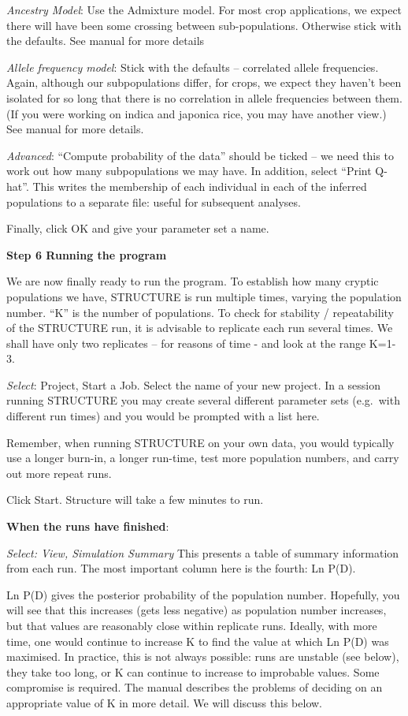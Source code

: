 \documentclass[
]{book}
\begin{document}
\emph{Ancestry Model}: Use the Admixture model. For most crop applications, we expect there will have been some crossing between sub-populations. Otherwise stick with the defaults. See manual for more details

\emph{Allele frequency model}: Stick with the defaults -- correlated allele frequencies. Again, although our subpopulations differ, for crops, we expect they haven't been isolated for so long that there is no correlation in allele frequencies between them. (If you were working on indica and japonica rice, you may have another view.) See manual for more details.

\emph{Advanced}: ``Compute probability of the data'' should be ticked -- we need this to work out how many subpopulations we may have. In addition, select ``Print Q-hat''. This writes the membership of each individual in each of the inferred populations to a separate file: useful for subsequent analyses.

Finally, click OK and give your parameter set a name.

\textbf{Step 6 Running the program}

We are now finally ready to run the program. To establish how many cryptic populations we have, STRUCTURE is run multiple times, varying the population number. ``K'' is the number of populations. To check for stability / repeatability of the STRUCTURE run, it is advisable to replicate each run several times. We shall have only two replicates -- for reasons of time - and look at the range K=1-3.

\emph{Select}: Project, Start a Job. Select the name of your new project. In a session running STRUCTURE you may create several different parameter sets (e.g.~with different run times) and you would be prompted with a list here.

Remember, when running STRUCTURE on your own data, you would typically use a longer burn-in, a longer run-time, test more population numbers, and carry out more repeat runs.

Click Start. Structure will take a few minutes to run.

\textbf{When the runs have finished}:

\emph{Select: View, Simulation Summary} This presents a table of summary information from each run. The most important column here is the fourth: Ln P(D).

Ln P(D) gives the posterior probability of the population number. Hopefully, you will see that this increases (gets less negative) as population number increases, but that values are reasonably close within replicate runs. Ideally, with more time, one would continue to increase K to find the value at which Ln P(D) was maximised. In practice, this is not always possible: runs are unstable (see below), they take too long, or K can continue to increase to improbable values. Some compromise is required. The manual describes the problems of deciding on an appropriate value of K in more detail. We will discuss this below.
\end{document}

